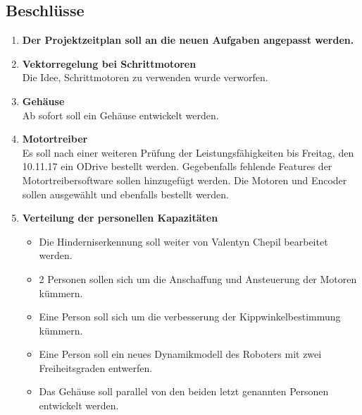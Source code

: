 \documentclass[10pt]{scrartcl}
\begin{document}
\subsection*{Beschlüsse}
	\begin{enumerate}
        \item \textbf{Der Projektzeitplan soll an die neuen Aufgaben angepasst werden.}
        \item \textbf{Vektorregelung bei Schrittmotoren} \\
        Die Idee, Schrittmotoren zu verwenden wurde verworfen.
        \item \textbf{Gehäuse} \\
        Ab sofort soll ein Gehäuse entwickelt werden.
        \item \textbf{Motortreiber} \\
        Es soll nach einer weiteren Prüfung der Leistungsfähigkeiten bis Freitag, den 10.11.17 ein ODrive bestellt werden. Gegebenfalls fehlende Features der Motortreibersoftware sollen hinzugefügt werden. Die Motoren und Encoder sollen ausgewählt und ebenfalls bestellt werden.
        \item \textbf{Verteilung der personellen Kapazitäten}
        \begin{itemize}%
            \item Die Hinderniserkennung soll weiter von Valentyn Chepil bearbeitet werden.
            \item 2 Personen sollen sich um die Anschaffung und Ansteuerung der Motoren kümmern.
            \item Eine Person soll sich um die verbesserung der Kippwinkelbestimmung kümmern.
            \item Eine Person soll ein neues Dynamikmodell des Roboters mit zwei Freiheitsgraden entwerfen.
            \item Das Gehäuse soll parallel von den beiden letzt genannten Personen entwickelt werden.
        \end{itemize}
	\end{enumerate}
\end{document}
